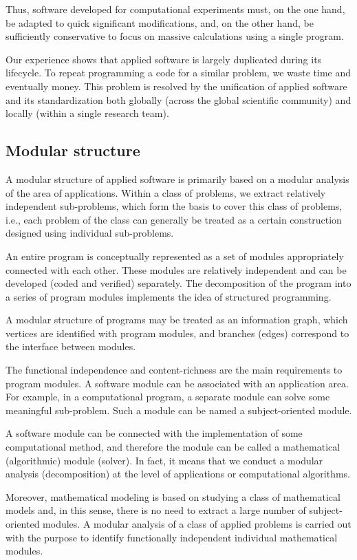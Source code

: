 \documentclass{elsarticle}
\begin{document}
Thus, software developed for computational experiments must, on the one hand, be adapted to quick significant modifications,
and, on the other hand, be sufficiently conservative to focus on massive calculations using a single program.

Our experience shows that applied software is largely duplicated during its lifecycle.
To repeat programming a code for a similar problem, we waste time and eventually money.
This problem is resolved by the unification of applied software and its standardization both globally 
(across the global scientific community) and locally (within a single research team).
 
\subsection{Modular structure}

A modular structure of applied software is primarily based on a modular analysis of the area of applications. 
Within a class of problems, we extract relatively independent sub-problems,
which form the basis to cover this class of problems, i.e., each problem of the class can generally be treated as 
a certain construction designed using individual sub-problems.

An entire program is conceptually represented as a set of modules appropriately connected with each other.
These modules are relatively independent and can be developed (coded and verified) separately.
The decomposition of the program into a series of program modules implements the idea of structured programming.

A modular structure of programs may be treated as an information graph, which vertices are identified with program modules,
and branches (edges) correspond to the interface between modules.

The functional independence and content-richness are the main requirements to program modules.
A software module can be associated with an application area.
For example, in a computational program, a separate module can solve some meaningful sub-problem.
Such a module can be named a subject-oriented module.

A software module can be connected with the implementation of some computational method,
and therefore the module can be called a mathematical (algorithmic) module (solver).
In fact, it means that we conduct a modular analysis (decomposition) at the level of applications or
computational algorithms.

Moreover, mathematical modeling is based on studying a class of mathematical models and, in this sense,
there is no need to extract a large number of subject-oriented modules.
A modular analysis of a class of applied problems is carried out with the purpose to identify 
functionally independent individual mathematical modules.
   
\end{document}
